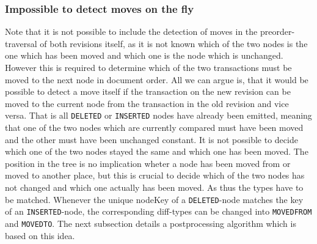 \subsubsection{Impossible to detect moves on the fly} Note that it is not possible to include the detection of moves in the preorder-traversal of both revisions itself, as it is not known which of the two nodes is the one which has been moved and which one is the node which is unchanged. However this is required to determine which of the two transactions must be moved to the next node in document order. All we can argue is, that it would be possible to detect a move itself if the transaction on the new revision can be moved to the current node from the transaction in the old revision and vice versa. That is all \texttt{DELETED} or \texttt{INSERTED} nodes have already been emitted, meaning that one of the two nodes which are currently compared must have been moved and the other must have been unchanged constant. It is not possible to decide which one of the two nodes stayed the same and which one has been moved. The position in the tree is no implication wheter a node has been moved from or moved to another place, but this is crucial to decide which of the two nodes has not changed and which one actually has been moved. As thus the types have to be matched. Whenever the unique nodeKey of a \texttt{DELETED}-node matches the key of an \texttt{INSERTED}-node, the corresponding diff-types can be changed into \texttt{MOVEDFROM} and \texttt{MOVEDTO}. The next subsection details a postprocessing algorithm which is based on this idea.

